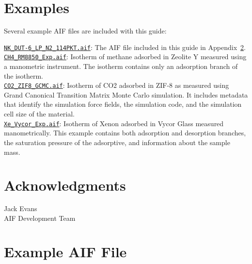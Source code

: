 \documentclass[preprint,pre,showkeys,12pt,superscriptaddress,nofootinbib,endfloats*]{revtex4-1}
\begin{document}
\section{Examples}

Several example AIF files are included with this guide:

\noindent \href{https://raw.githubusercontent.com/NIST-ISODB/aif_tutorial/master/Files/NK_DUT-6_LP_N2_114PKT.aif}{\texttt{NK\_DUT-6\_LP\_N2\_114PKT.aif}}:  The AIF file included in this guide in Appendix~\ref{appendix:A}.\\

\noindent \href{https://raw.githubusercontent.com/NIST-ISODB/aif_tutorial/master/Files/CH4_RM8850_Exp.aif}{\texttt{CH4\_RM8850\_Exp.aif}}: Isotherm of methane adsorbed in Zeolite Y measured using a manometric instrument. The isotherm contains only an adsorption branch of the isotherm.\\

\noindent \href{https://raw.githubusercontent.com/NIST-ISODB/aif_tutorial/master/Files/CO2_ZIF8_GCMC.aif}{\texttt{CO2\_ZIF8\_GCMC.aif}}: Isotherm of CO2 adsorbed in ZIF-8 as measured using Grand Canonical Transition Matrix Monte Carlo simulation. It includes metadata that identify the simulation force fields, the simulation code, and the simulation cell size of the material.\\

\noindent \href{https://raw.githubusercontent.com/NIST-ISODB/aif_tutorial/master/Files/Xe_Vycor_Exp.aif}{\texttt{Xe\_Vycor\_Exp.aif}}: Isotherm of Xenon adsorbed in Vycor Glass measured manometrically. This example contains both adsorption and desorption branches, the saturation pressure of the adsorptive, and information about the sample mass.

\section*{Acknowledgments}
\noindent Jack Evans\\
AIF Development Team



\newpage
\appendix
\section{Example AIF File}\label{appendix:A}





%
\end{document}
